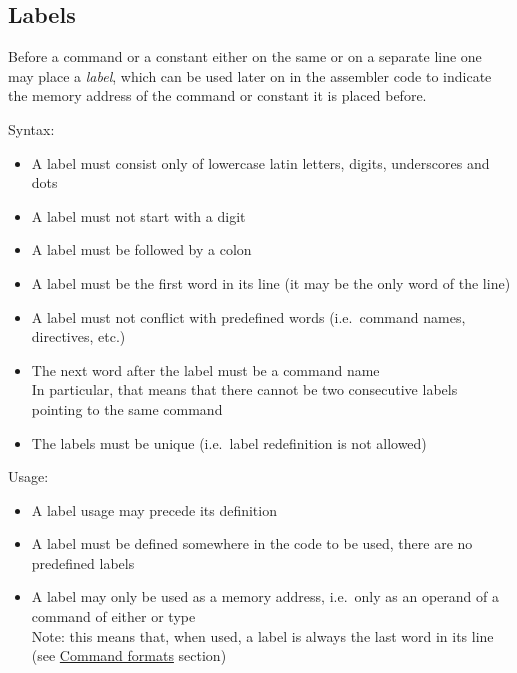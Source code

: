 \hypertarget{labels}{
	\subsection{Labels}
}

Before a command or a constant either on the same or on a separate line 
one may place a \textit{label}, which can be used later on in 
the assembler code to indicate the memory address of 
the command or constant it is placed before.

Syntax:

\begin{itemize}
    \item A label must consist only of lowercase latin letters, digits, 
    underscores and dots
    
    \item A label must not start with a digit

    \item A label must be followed by a colon

    \item A label must be the first word in its line
    (it may be the only word of the line)

    \item A label must not conflict with predefined words
    (i.e.\ command names, directives, etc.)

    \item The next word after the label must be a command name\\
    In particular, that means that there cannot be two consecutive
    labels pointing to the same command

    \item The labels must be unique (i.e.\ label redefinition is not allowed)
\end{itemize}

Usage:

\begin{itemize}
    \item A label usage may precede its definition

    \item A label must be defined somewhere in the code to be used,
    there are no predefined labels

    \item A label may only be used as a memory address, i.e.\ only as
    an operand of a command of either  or  type \\
    Note: this means that, when used, a label is always the last word in
    its line (see \hyperlink{command:formats}{Command formats} section)
\end{itemize}
